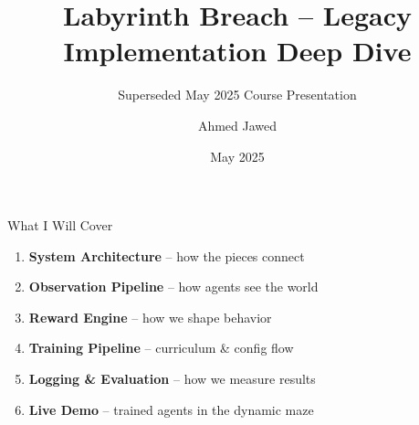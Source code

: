 \documentclass[aspectratio=169,11pt]{beamer}
\title{Labyrinth Breach -- Legacy Implementation Deep Dive}
\subtitle{Superseded May 2025 Course Presentation}
\author{Ahmed Jawed}
\institute{AI641 -- AI for Robotics | MS AI, LUMS}
\date{May 2025}
\begin{document}
\begin{frame}
\titlepage
\end{frame}

\begin{frame}{What I Will Cover}
\begin{enumerate}
\item \textbf{System Architecture} -- how the pieces connect
\item \textbf{Observation Pipeline} -- how agents see the world
\item \textbf{Reward Engine} -- how we shape behavior
\item \textbf{Training Pipeline} -- curriculum \& config flow
\item \textbf{Logging \& Evaluation} -- how we measure results
\item \textbf{Live Demo} -- trained agents in the dynamic maze
\end{enumerate}
\end{frame}
\end{document}
